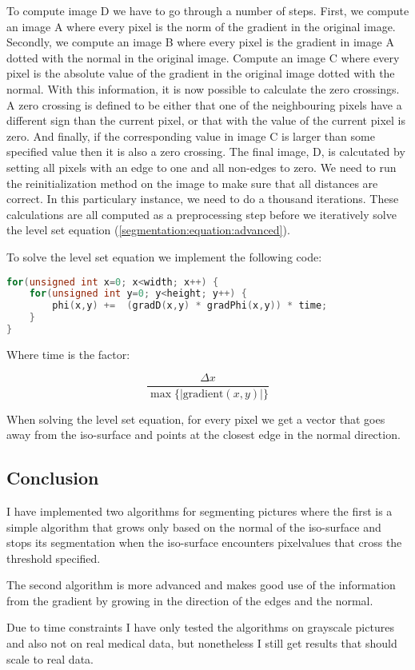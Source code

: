 To compute image D we have to go through a number of steps. First, we
compute an image A where every pixel is the norm of the gradient in
the original image. Secondly, we compute an image B where every pixel
is the gradient in image A dotted with the normal in the original
image. Compute an image C where every pixel is the absolute value of
the gradient in the original image dotted with the normal.  With this
information, it is now possible to calculate the zero crossings. A
zero crossing is defined to be either that one of the neighbouring
pixels have a different sign than the current pixel, or that with the
value of the current pixel is zero. And finally, if the corresponding
value in image C is larger than some specified value then it is also a
zero crossing. The final image, D, is calcutated by setting all pixels
with an edge to one and all non-edges to zero. We need to run the
reinitialization method on the image to make sure that all distances
are correct. In this particulary instance, we need to do a thousand
iterations. These calculations are all computed as a preprocessing
step before we iteratively solve the level set equation
(\vref*{segmentation:equation:advanced}).

To solve the level set equation we implement the following code:
\begin{lstlisting}[language=c++]
for(unsigned int x=0; x<width; x++) {
    for(unsigned int y=0; y<height; y++) {
        phi(x,y) +=  (gradD(x,y) * gradPhi(x,y)) * time;
    }
}
\end{lstlisting}

Where time is the factor:

\begin{equation*}
  \dfrac{\Delta x} {\max \{|\textrm{gradient}(x,y)|\}} 
\end{equation*}

When solving the level set equation, for every pixel we get a vector
that goes away from the iso-surface and points at the closest edge in
the normal direction.

\subsection{Conclusion}
\label{segmentation:conclusion}

I have implemented two algorithms for segmenting pictures where the
first is a simple algorithm that grows only based on the normal of the
iso-surface and stops its segmentation when the iso-surface encounters
pixelvalues that cross the threshold specified.

The second algorithm is more advanced and makes good use of the
information from the gradient by growing in the direction of the edges
and the normal.

Due to time constraints I have only tested the algorithms on grayscale
pictures and also not on real medical data, but nonetheless I still
get results that should scale to real data.


